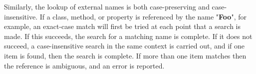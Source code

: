 
Similarly, the lookup of external names is both case-preserving and
case-insensitive.  If a class, method, or property is referenced by the
name "\textbf{Foo}", for example, an exact-case match will first
be tried at each point that a search is made.
If this succeeds, the search for a matching name is complete.
If it does not succeed, a case-insensitive search in the same context
is carried out, and if one item is found, then the search is complete.
If more than one item matches then the reference is ambiguous, and an
error is reported.
 
 
 
 
 
